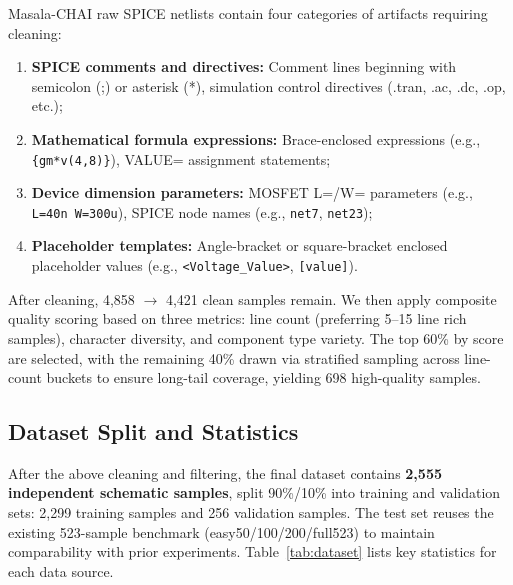 Masala-CHAI raw SPICE netlists contain four categories of artifacts requiring cleaning:
\begin{enumerate}[nosep]
    \item \textbf{SPICE comments and directives:} Comment lines beginning with semicolon (;) or asterisk (*), simulation control directives (.tran, .ac, .dc, .op, etc.);
    \item \textbf{Mathematical formula expressions:} Brace-enclosed expressions (e.g., \texttt{\{gm*v(4,8)\}}), VALUE= assignment statements;
    \item \textbf{Device dimension parameters:} MOSFET L=/W= parameters (e.g., \texttt{L=40n W=300u}), SPICE node names (e.g., \texttt{net7}, \texttt{net23});
    \item \textbf{Placeholder templates:} Angle-bracket or square-bracket enclosed placeholder values (e.g., \texttt{<Voltage\_Value>}, \texttt{[value]}).
\end{enumerate}
After cleaning, 4,858 $\to$ 4,421 clean samples remain. We then apply composite quality scoring based on three metrics: line count (preferring 5--15 line rich samples), character diversity, and component type variety. The top 60\% by score are selected, with the remaining 40\% drawn via stratified sampling across line-count buckets to ensure long-tail coverage, yielding 698 high-quality samples.

\subsection{Dataset Split and Statistics}

After the above cleaning and filtering, the final dataset contains \textbf{2,555 independent schematic samples}, split 90\%/10\% into training and validation sets: 2,299 training samples and 256 validation samples. The test set reuses the existing 523-sample benchmark (easy50/100/200/full523) to maintain comparability with prior experiments. Table~\ref{tab:dataset} lists key statistics for each data source.


